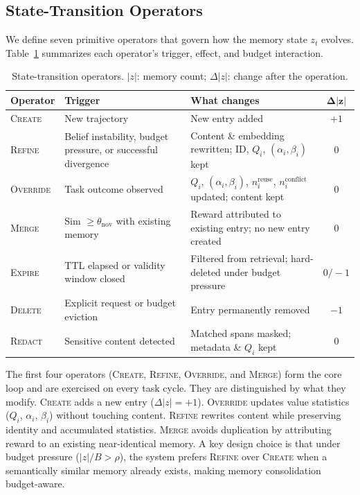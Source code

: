 \subsection{State-Transition Operators}
\label{sec:state-transitions}

We define seven primitive operators that govern how the memory state $z_t$ evolves. Table~\ref{tab:operators} summarizes each operator's trigger, effect, and budget interaction.

\begin{table}[t]
\centering
\caption{State-transition operators. $|z|$: memory count; $\Delta|z|$: change after the operation.}
\label{tab:operators}
\small
\setlength{\tabcolsep}{4pt}
\begin{tabular}{@{}l p{3.2cm} p{4.8cm} c@{}}
\toprule
\textbf{Operator} & \textbf{Trigger} & \textbf{What changes} & $\boldsymbol{\Delta|z|}$ \\
\midrule
\textsc{Create}
  & New trajectory
  & New entry added
  & $+1$ \\[3pt]
\textsc{Refine}
  & Belief instability, budget pressure, or successful divergence
  & Content \& embedding rewritten; ID, $Q_i$, $(\alpha_i,\beta_i)$ kept
  & $0$ \\[3pt]
\textsc{Override}
  & Task outcome observed
  & $Q_i$, $(\alpha_i,\beta_i)$, $n_i^{\mathrm{reuse}}$, $n_i^{\mathrm{conflict}}$ updated; content kept
  & $0$ \\[3pt]
\textsc{Merge}
  & Sim $\geq \theta_{\mathrm{nov}}$ with existing memory
  & Reward attributed to existing entry; no new entry created
  & $0$ \\[3pt]
\textsc{Expire}
  & TTL elapsed or validity window closed
  & Filtered from retrieval; hard-deleted under budget pressure
  & $0/-1$ \\[3pt]
\textsc{Delete}
  & Explicit request or budget eviction
  & Entry permanently removed
  & $-1$ \\[3pt]
\textsc{Redact}
  & Sensitive content detected
  & Matched spans masked; metadata \& $Q_i$ kept
  & $0$ \\
\bottomrule
\end{tabular}
\end{table}

The first four operators (\textsc{Create}, \textsc{Refine}, \textsc{Override}, and \textsc{Merge}) form the core loop and are exercised on every task cycle. They are distinguished by what they modify. \textsc{Create} adds a new entry ($\Delta|z|{=}+1$). \textsc{Override} updates value statistics ($Q_i$, $\alpha_i$, $\beta_i$) without touching content. \textsc{Refine} rewrites content while preserving identity and accumulated statistics. \textsc{Merge} avoids duplication by attributing reward to an existing near-identical memory. A key design choice is that under budget pressure ($|z|/B > \rho$), the system prefers \textsc{Refine} over \textsc{Create} when a semantically similar memory already exists, making memory consolidation budget-aware.

